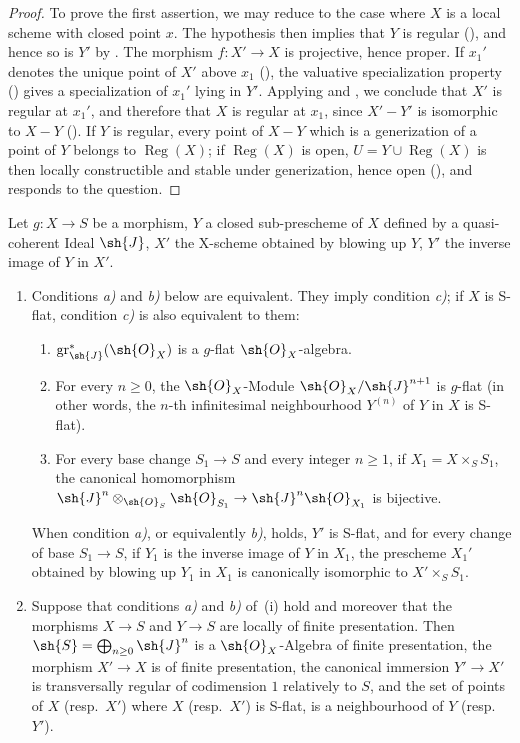 \begin{proof}
To prove the first assertion, we may reduce to the case where $X$ is a local scheme with closed point $x$. The hypothesis then implies that $Y$ is regular (), and hence so is $Y'$ by .
The morphism $f:X'\to X$ is projective, hence proper. If $x_1'$ denotes the unique point of $X'$ above $x_1$ (), the valuative specialization property () gives a specialization of $x_1'$ lying in $Y'$. Applying  and , we conclude that $X'$ is regular at $x_1'$, and therefore that $X$ is regular at $x_1$, since $X'-Y'$ is isomorphic to $X-Y$ ().
If $Y$ is regular, every point of $X-Y$ which is a generization of a point of $Y$ belongs to $\operatorname{Reg}(X)$; if $\operatorname{Reg}(X)$ is open, $U=Y\cup\operatorname{Reg}(X)$ is then locally constructible and stable under generization, hence open (), and responds to the question.
\end{proof}

\begin{proposition}[19.4.6]
\label{IV.19.4.6}
Let $g:X\to S$ be a morphism, $Y$ a closed sub-prescheme of $X$ defined by a quasi-coherent Ideal $\sh{J}$, $X'$ the X-scheme obtained by blowing up $Y$, $Y'$ the inverse image of $Y$ in $X'$.
\begin{enumerate}[label=(\roman*)]
  \item Conditions \emph{a)} and \emph{b)} below are equivalent. They imply condition \emph{c)}; if $X$ is S-flat, condition \emph{c)} is also equivalent to them:
  \begin{enumerate}[label=\emph{\alph*)}]
    \item $\operatorname{gr}_\sh{J}^*(\sh{O}_X)$ is a $g$-flat $\sh{O}_X$-algebra.
    \item For every $n\geq 0$, the $\sh{O}_X$-Module $\sh{O}_X/\sh{J}^{n+1}$ is $g$-flat (in other words, the $n$-th infinitesimal neighbourhood $Y^{(n)}$ of $Y$ in $X$  is S-flat).
    \item For every base change $S_1\to S$ and every integer $n\geq 1$, if $X_1=X\times_S S_1$, the canonical homomorphism $\sh{J}^n\otimes_{\sh{O}_S}\sh{O}_{S_1}\to\sh{J}^n\sh{O}_{X_1}$ is bijective.
  \end{enumerate}
When condition \emph{a)}, or equivalently \emph{b)}, holds, $Y'$ is S-flat, and for every change of base $S_1\to S$, if $Y_1$ is the inverse image of $Y$ in $X_1$, the prescheme $X_1'$ obtained by blowing up $Y_1$ in $X_1$ is canonically isomorphic to $X'\times_S S_1$.
  \item Suppose that conditions \emph{a)} and \emph{b)} of~(i) hold and moreover that the morphisms $X\to S$ and $Y\to S$ are locally of finite presentation.
Then $\sh{S}=\bigoplus_{n\geq 0}\sh{J}^n$ is a $\sh{O}_X$-Algebra of finite presentation, the morphism $X'\to X$ is of finite presentation, the canonical immersion $Y'\to X'$ is transversally regular of codimension $1$ relatively to $S$, and the set of points of $X$ (resp.\ $X'$) where $X$ (resp.\ $X'$) is S-flat, is a neighbourhood of $Y$ (resp.\ $Y'$).
\end{enumerate}
\end{proposition}

